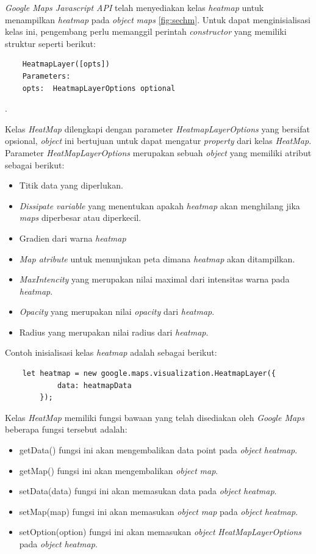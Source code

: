 \textit{Google Maps Javascript API} telah menyediakan kelas \textit{heatmap} untuk menampilkan \textit{heatmap} pada \textit{object} \textit{maps} \ref{fig:sechm}. Untuk dapat menginisialisasi kelas ini, pengembang perlu memanggil perintah \textit{constructor} yang memiliki struktur seperti berikut:
\begin{lstlisting}
    HeatmapLayer([opts])
    Parameters: 
    opts:  HeatmapLayerOptions optional
\end{lstlisting}.

Kelas \textit{HeatMap} dilengkapi dengan parameter \textit{HeatmapLayerOptions} yang bersifat opsional, \textit{object} ini  bertujuan untuk dapat mengatur \textit{property} dari kelas \textit{HeatMap}. Parameter \textit{HeatMapLayerOptions} merupakan sebuah \textit{object} yang memiliki atribut sebagai berikut:

\begin{itemize}
    \item Titik data yang diperlukan.
    \item \textit{Dissipate variable} yang menentukan apakah \textit{heatmap} akan menghilang jika \textit{maps} diperbesar atau diperkecil.
    \item Gradien dari warna \textit{heatmap}
    \item \textit{Map atribute} untuk menunjukan peta dimana \textit{heatmap} akan ditampilkan.
    \item \textit{MaxIntencity} yang merupakan nilai maximal dari intensitas warna pada \textit{heatmap}.
    \item \textit{Opacity} yang merupakan nilai \textit{opacity} dari \textit{heatmap}.
    \item Radius yang merupakan nilai radius dari \textit{heatmap}.
\end{itemize}

Contoh inisialisasi kelas \textit{heatmap} adalah sebagai berikut:
\begin{lstlisting}
    let heatmap = new google.maps.visualization.HeatmapLayer({
            data: heatmapData
        });
\end{lstlisting}
Kelas \textit{HeatMap} memiliki fungsi bawaan yang telah disediakan oleh \textit{Google Maps} beberapa fungsi tersebut adalah:
\begin{itemize}
    \item getData() fungsi ini akan mengembalikan data point pada \textit{object} \textit{heatmap}.
    \item getMap() fungsi ini akan mengembalikan \textit{object} \textit{map}.
    \item setData(data) fungsi ini akan memasukan data pada \textit{object} \textit{heatmap}.
    \item setMap(map) fungsi ini akan memasukan \textit{object} \textit{map} pada \textit{object} \textit{heatmap}.
    \item setOption(option) fungsi ini akan memasukan  \textit{object} \textit{HeatMapLayerOptions} pada \textit{object} \textit{heatmap}.
\end{itemize}